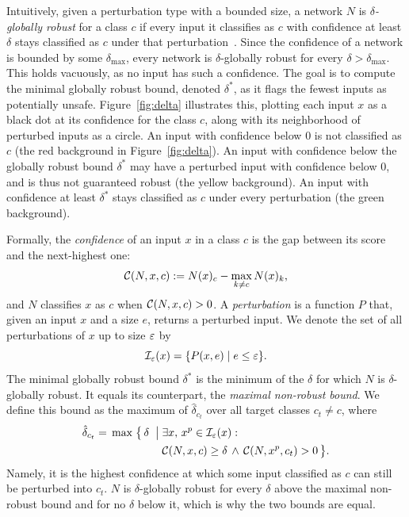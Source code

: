 Intuitively, given a perturbation type with a bounded size, a network
$N$ is \emph{$\delta$-globally robust} for a class $c$ if every input
it classifies as $c$ with confidence at least $\delta$ stays
classified as $c$ under that perturbation~\citep{kabaha2024vhagar}.
Since the confidence of a network is bounded by some $\delta_{\max}$,
every network is $\delta$-globally robust for every
$\delta > \delta_{\max}$. This holds vacuously, as no input has such a
confidence. The goal is to
compute the minimal globally robust bound, denoted $\delta^*$, as it
flags the fewest inputs as potentially unsafe.
Figure~\ref{fig:delta} illustrates this, plotting each input $x$ as a
black dot at its confidence for the class $c$, along with its
neighborhood of perturbed inputs as a circle. An input with confidence
below $0$ is not classified as $c$ (the red background in Figure~\ref{fig:delta}). An input with
confidence below the globally robust bound $\delta^*$ may have a
perturbed input with confidence below $0$, and is thus not guaranteed
robust (the yellow background). An input with confidence at least
$\delta^*$ stays classified as $c$ under every perturbation (the green background).

Formally, the \emph{confidence} of an input $x$ in a class $c$ is the
gap between its score and the next-highest one:
\begin{equation}
  \mathcal{C}(N,x,c) := N(x)_c - \max_{k \neq c} N(x)_k,
  \label{eq:confidence}
\end{equation}
and $N$ classifies $x$ as $c$ when $\mathcal{C}(N,x,c) > 0$. A
\emph{perturbation} is a function $P$ that, given an input $x$ and a
size $e$, returns a perturbed input. We denote the set of all
perturbations of $x$ up to size $\varepsilon$ by
\begin{equation}
  \mathcal{I}_\varepsilon(x) = \{P(x, e) \mid e \leq \varepsilon\}.
  \label{eq:perturbation-set}
\end{equation}
The minimal globally robust bound $\delta^*$ is the minimum of the $\delta$ for which $N$ is $\delta$-globally robust. It equals its counterpart, the \emph{maximal non-robust bound}.%
We define this bound as the maximum of $\hat{\delta}_{c_t}$ over all
target classes $c_t \neq c$, where
\begin{equation}
\begin{aligned}
  \hat{\delta}_{c_t} = \,\max\; \bigl\{\, \delta \;\bigm|\;
  &\exists x,\, x^{p} \in \mathcal{I}_\varepsilon(x): \\
  &\mathcal{C}(N,x,c) \geq \delta \,\wedge\, \mathcal{C}(N,x^{p},c_t) > 0
  \,\bigr\}.
\end{aligned}
\label{eq:max-non-robust-bound}
\end{equation}
Namely, it is the highest confidence at which some input classified as
$c$ can still be perturbed into $c_t$.
$N$ is $\delta$-globally robust for every $\delta$ above the
maximal non-robust bound and for no $\delta$ below it, which is why the
two bounds are equal.

